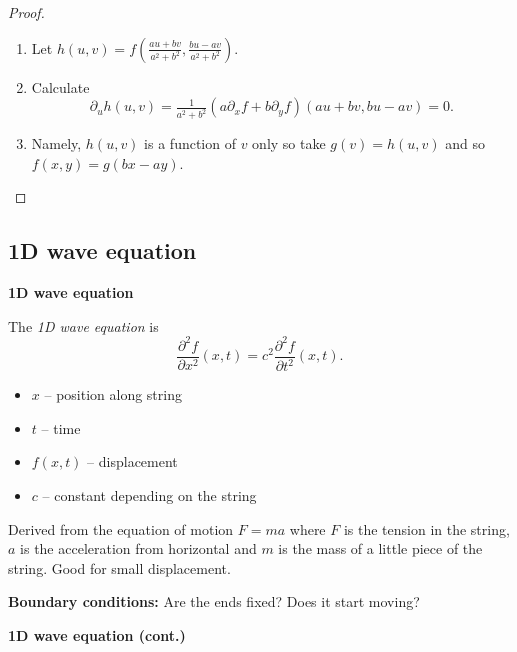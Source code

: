 \begin{proof}
\begin{description}
\begin{enumerate}
                  \item Let \(h(u,v)=f(\frac{au + bv}{a^2 + b^2}, \frac{bu-av}{a^2+b^2})\).
                  \item Calculate
                        \[
                            \partial_u h(u,v)
                            = \tfrac{1}{{a^2 + b^2}}
                            \left( a \partial_x f
                            + b \partial_y f \right)  (au + bv, bu-av) = 0.
                        \]
                  \item Namely, \(h(u,v)\) is a function of \(v\) only so take \(g(v) = h(u,v)\) and so \(f(x,y) = g(bx-ay)\).
              \end{enumerate}
    \end{description}

\end{proof}





\subsection{1D wave equation}


\textbf{1D wave equation}

The \emph{1D wave equation} is
\[
    \frac{\partial^2 f}{\partial x^2}(x,t) = c^2  \frac{\partial^2 f}{\partial t^2}(x,t).
\]
\begin{itemize}
    \item  \(x\) -- position along string
    \item \(t\) -- time
    \item \(f(x,t)\) -- displacement
    \item \(c\) -- constant depending on the string
\end{itemize}

Derived from the equation of motion \(F = m a\) where \(F\) is the tension in the string, \(a\) is the acceleration from horizontal and \(m\) is the mass of a little piece of the string.
Good for small displacement.

\textbf{Boundary conditions:}
Are the ends fixed? Does it start moving?







\textbf{1D wave equation (cont.)}

